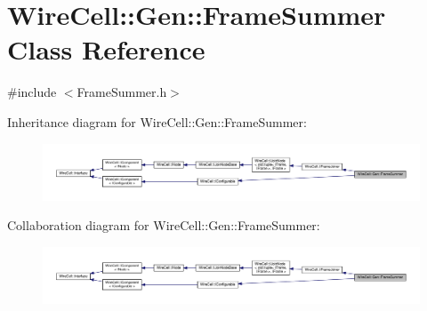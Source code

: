 \hypertarget{class_wire_cell_1_1_gen_1_1_frame_summer}{}\section{Wire\+Cell\+:\+:Gen\+:\+:Frame\+Summer Class Reference}
\label{class_wire_cell_1_1_gen_1_1_frame_summer}


{\ttfamily \#include $<$Frame\+Summer.\+h$>$}



Inheritance diagram for Wire\+Cell\+:\+:Gen\+:\+:Frame\+Summer\+:
\nopagebreak
\begin{figure}[H]
\begin{center}
\leavevmode
\includegraphics[width=350pt]{class_wire_cell_1_1_gen_1_1_frame_summer__inherit__graph}
\end{center}
\end{figure}


Collaboration diagram for Wire\+Cell\+:\+:Gen\+:\+:Frame\+Summer\+:
\nopagebreak
\begin{figure}[H]
\begin{center}
\leavevmode
\includegraphics[width=350pt]{class_wire_cell_1_1_gen_1_1_frame_summer__coll__graph}
\end{center}
\end{figure}
